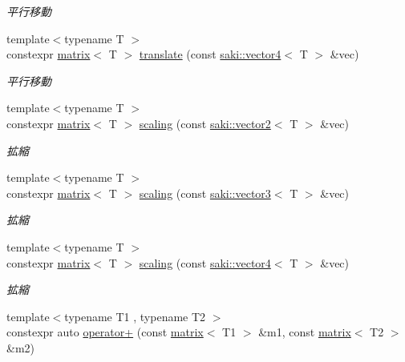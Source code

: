 \begin{DoxyCompactItemize}
\begin{DoxyCompactList}\small\item\em 平行移動 \end{DoxyCompactList}\item 
{\footnotesize template$<$typename T $>$ }\\constexpr \mbox{\hyperlink{classsaki_1_1matrix}{matrix}}$<$ T $>$ \mbox{\hyperlink{namespacesaki_abdd23c2e56d1500ae2e8b662c5ddcf7c}{translate}} (const \mbox{\hyperlink{classsaki_1_1vector4}{saki\+::vector4}}$<$ T $>$ \&vec)
\begin{DoxyCompactList}\small\item\em 平行移動 \end{DoxyCompactList}\item 
{\footnotesize template$<$typename T $>$ }\\constexpr \mbox{\hyperlink{classsaki_1_1matrix}{matrix}}$<$ T $>$ \mbox{\hyperlink{namespacesaki_abda5ab30bf4dc9240857d62d56e590f9}{scaling}} (const \mbox{\hyperlink{classsaki_1_1vector2}{saki\+::vector2}}$<$ T $>$ \&vec)
\begin{DoxyCompactList}\small\item\em 拡縮 \end{DoxyCompactList}\item 
{\footnotesize template$<$typename T $>$ }\\constexpr \mbox{\hyperlink{classsaki_1_1matrix}{matrix}}$<$ T $>$ \mbox{\hyperlink{namespacesaki_affcd920fe27abc17e5fa50f04bfabe05}{scaling}} (const \mbox{\hyperlink{classsaki_1_1vector3}{saki\+::vector3}}$<$ T $>$ \&vec)
\begin{DoxyCompactList}\small\item\em 拡縮 \end{DoxyCompactList}\item 
{\footnotesize template$<$typename T $>$ }\\constexpr \mbox{\hyperlink{classsaki_1_1matrix}{matrix}}$<$ T $>$ \mbox{\hyperlink{namespacesaki_aededd0f357c48d1e96af77b06cb3e786}{scaling}} (const \mbox{\hyperlink{classsaki_1_1vector4}{saki\+::vector4}}$<$ T $>$ \&vec)
\begin{DoxyCompactList}\small\item\em 拡縮 \end{DoxyCompactList}\item 
{\footnotesize template$<$typename T1 , typename T2 $>$ }\\constexpr auto \mbox{\hyperlink{namespacesaki_a10eb3090250dfcb43dd1c7579b6b473c}{operator+}} (const \mbox{\hyperlink{classsaki_1_1matrix}{matrix}}$<$ T1 $>$ \&m1, const \mbox{\hyperlink{classsaki_1_1matrix}{matrix}}$<$ T2 $>$ \&m2)

\end{DoxyCompactItemize}
